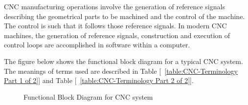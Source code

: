CNC manufacturing operations involve the generation of reference signals describing the geometrical parts to be machined and the control of the machine. The control is such that it follows those reference signals. In modern CNC machines, the generation of reference signals, construction and execution of control loops are accomplished in software within a computer.    
\vspace*{1\baselineskip}

The figure below shows the functional block diagram for a typical CNC system. The meanings of terms used are described in Table [~\ref{table:CNC-Terminology Part 1 of 2}] and Table [~\ref{table:CNC-Terminology Part 2 of 2}]. 

\begin{figure}[htbp]
	\begin{center}
		\caption{Functional Block Diagram for CNC system}
		\label{fig:Functional-Block-Diagram-for-CNC-System.jpg}
	\end{center}
\end{figure}



